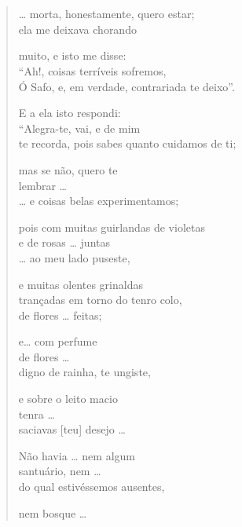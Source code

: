 \section*{}
\begin{verse}
\ldots{} morta, honestamente, quero estar;\\
ela me deixava chorando\\

\medskip

muito, e isto me disse:\\
``Ah!, coisas terríveis sofremos,\\
Ó Safo, e, em verdade, contrariada te deixo''.\\

\medskip

E a ela isto respondi:\\
``Alegra-te, vai, e de mim\\
te recorda, pois sabes quanto cuidamos de ti;\\

\medskip

mas se não, quero te\\
lembrar \ldots{}\\
\ldots{} e coisas belas experimentamos;\\

\medskip

pois com muitas guirlandas de violetas\\
e de rosas \ldots{} juntas\\
\ldots{} ao meu lado puseste,\\			

\medskip

e muitas olentes grinaldas\\
trançadas em torno do tenro colo, \\
de flores \ldots{} feitas;\\

\medskip

e\ldots{} com perfume\\
de flores \ldots{}\\
digno de rainha, te ungiste,\\

\medskip

e sobre o leito macio\\
tenra \ldots{}\\
saciavas [teu] desejo \ldots{}\\

\medskip

Não havia \ldots{} nem algum\\
santuário, nem \ldots{}\\
do qual estivéssemos ausentes,\\

\medskip

nem bosque \ldots{}
\end{verse}


